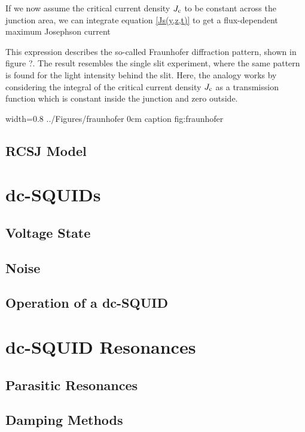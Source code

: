 If we now assume the critical current density $J_{\rm c}$ to be constant across the junction area, we can integrate equation \ref{Js(y,z,t)} to get a flux-dependent maximum Josephson current


This expression describes the so-called Fraunhofer diffraction pattern, shown in figure ?. The result resembles the single slit experiment, where the same pattern is found for the light intensity behind the slit. Here, the analogy works by considering the integral of the critical current density $J_{\rm c}$ as a transmission function which is constant inside the junction and zero outside. 

{width=0.8\textwidth}
{../Figures/fraunhofer}
{0cm}
{caption} 
{fig:fraunhofer}


\subsection{RCSJ Model}

\blindtext[1]

\section{dc-SQUIDs}

\subsection{Voltage State}

\subsection{Noise}

\subsection{Operation of a dc-SQUID}


\section{dc-SQUID Resonances}

\subsection{Parasitic Resonances}

\subsection{Damping Methods}


